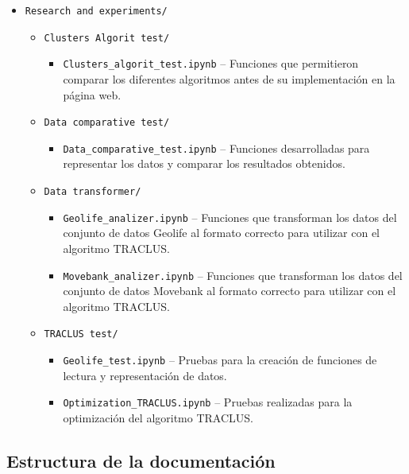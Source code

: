 \begin{itemize}
    \item \texttt{Research and experiments/}
    \begin{itemize}
        \item \texttt{Clusters Algorit test/}
        \begin{itemize}
            \item \texttt{Clusters\_algorit\_test.ipynb} -- Funciones que permitieron comparar los diferentes algoritmos antes de su implementación en la página web.
        \end{itemize}
        \item \texttt{Data comparative test/}
        \begin{itemize}
            \item \texttt{Data\_comparative\_test.ipynb} -- Funciones desarrolladas para representar los datos y comparar los resultados obtenidos.
        \end{itemize}
        \item \texttt{Data transformer/}
        \begin{itemize}
            \item \texttt{Geolife\_analizer.ipynb} -- Funciones que transforman los datos del conjunto de datos Geolife \cite{geolife_trajectories} al formato correcto para utilizar con el algoritmo TRACLUS.
            \item \texttt{Movebank\_analizer.ipynb} -- Funciones que transforman los datos del conjunto de datos Movebank \cite{movebank} al formato correcto para utilizar con el algoritmo TRACLUS.
        \end{itemize}
        \item \texttt{TRACLUS test/}
        \begin{itemize}
            \item \texttt{Geolife\_test.ipynb} -- Pruebas para la creación de funciones de lectura y representación de datos.
            \item \texttt{Optimization\_TRACLUS.ipynb} -- Pruebas realizadas para la optimización del algoritmo TRACLUS.
        \end{itemize}
    \end{itemize}
\end{itemize}


\subsection*{Estructura de la documentación}

